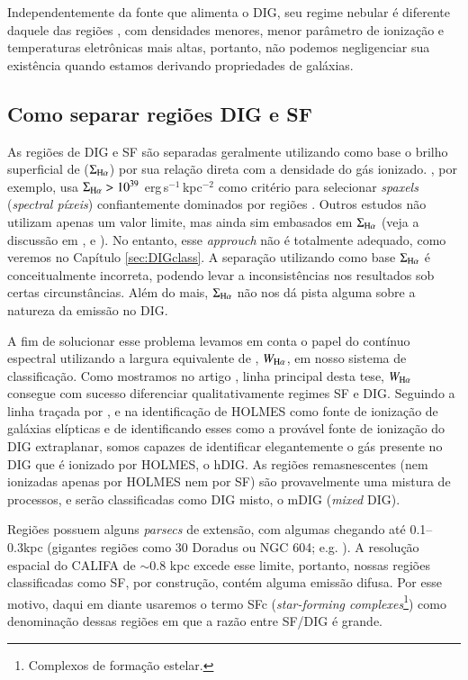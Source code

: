 Independentemente da fonte que alimenta o DIG, seu regime nebular é diferente daquele das regiões \hii, com densidades menores, menor parâmetro de ionização e temperaturas eletrônicas mais altas, portanto, não podemos negligenciar sua existência quando estamos derivando propriedades de galáxias.

\subsection{Como separar regiões DIG e SF}
\label{sec:intro:DIG:class}
As regiões de DIG e SF são separadas geralmente utilizando como base o brilho superficial de \Ha ($\Sigma_{\Ha}$) por sua relação direta com a densidade do gás ionizado. \citet{Zhang.etal.2017a}, por exemplo, usa $\Sigma_{\Ha} > 10^{39}$ erg$\,$s$^{-1}\,$kpc$^{-2}$ como critério para selecionar {\em spaxels} ({\em spectral píxeis}) confiantemente dominados por regiões \hii. Outros estudos não utilizam apenas um valor limite, mas ainda sim embasados em $\Sigma_{\Ha}$ (veja a discussão em \citealt{Zurita.etal.2000}, \citealt{Oey.etal.2007} e \citealt{Vogt.etal.2017a}). No entanto, esse {\em approuch} não é totalmente adequado, como veremos no Capítulo \ref{sec:DIGclass}. A separação utilizando como base $\Sigma_{\Ha}$ é conceitualmente incorreta, podendo levar a inconsistências nos resultados sob certas circunstâncias. Além do mais, $\Sigma_{\Ha}$ não nos dá pista alguma sobre a natureza da emissão no DIG.

A fim de solucionar esse problema levamos em conta o papel do contínuo espectral utilizando a largura equivalente de \Ha, $W_{\Ha}$, em nosso sistema de classificação. Como mostramos no artigo \citet[][Apêndice \ref{apendice:DIGpaper0}]{Lacerda.etal.2018}, linha principal desta tese, $W_{\Ha}$ consegue com sucesso diferenciar qualitativamente regimes SF e DIG. Seguindo a linha traçada por \citet{Binette.etal.1994a}, \citet{Stasinska.etal.2008a} e \citet{CidFernandes.etal.2011a} na identificação de HOLMES como fonte de ionização de galáxias elípticas e de \citet{FloresFajardo.etal.2011a} identificando esses como a provável fonte de ionização do DIG extraplanar, somos capazes de identificar elegantemente o gás presente no DIG que é ionizado por HOLMES, o hDIG. As regiões remasnescentes (nem ionizadas apenas por HOLMES nem por SF) são provavelmente uma mistura de processos, e serão classificadas como DIG misto, o mDIG ({\em mixed} DIG).

Regiões \hii possuem alguns {\em parsecs} de extensão, com algumas chegando até 0.1--0.3kpc (gigantes regiões como 30 Doradus ou NGC 604; e.g. \citealt{Rosa.y.Enrique.2000}). A resolução espacial do CALIFA de $\sim 0.8$ kpc excede esse limite, portanto, nossas regiões classificadas como SF, por construção, contém alguma emissão difusa. Por esse motivo, daqui em diante usaremos o termo SFc ({\em star-forming complexes}\footnote{Complexos de formação estelar.}) como denominação dessas regiões em que a razão entre SF/DIG é grande.


